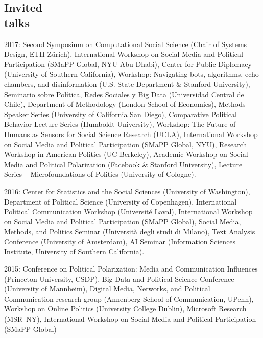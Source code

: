 \documentclass[margin,line,11pt]{resume}
\begin{document}
\begin{resume}
    
        \section{\mysidestyle Invited\\talks}
        
2017: Second Symposium on Computational Social Science (Chair of Systems Design, ETH Z\"{u}rich), International Workshop on Social Media and Political Participation (SMaPP Global, NYU Abu Dhabi), Center for Public Diplomacy (University of Southern California), Workshop: Navigating bots, algorithms, echo chambers, and disinformation (U.S. State Department \& Stanford University), Seminario sobre Pol\'{i}tica, Redes Sociales y Big Data (Universidad Central de Chile), Department of Methodology (London School of Economics), Methods Speaker Series (University of California San Diego), Comparative Political Behavior Lecture Series (Humboldt University), Workshop: The Future of Humans as Sensors for Social Science Research (UCLA),  International Workshop on Social Media and Political Participation (SMaPP Global, NYU), Research Workshop in American Politics (UC Berkeley), Academic Workshop on Social Media and Political Polarization (Facebook \& Stanford University),  Lecture Series -- Microfoundations of Politics (University of Cologne).

\newpage

2016: Center for Statistics and the Social Sciences (University of Washington), Department of Political Science (University of Copenhagen), International Political Communication Workshop (Universit\'{e} Laval), International Workshop on Social Media and Political Participation (SMaPP Global), Social Media, Methods, and Politics Seminar (Universit\`{a} degli studi di Milano), Text Analysis Conference (University of Amsterdam), AI Seminar (Information Sciences Institute, University of Southern California).

2015: Conference on Political Polarization: Media and Communication Influences (Princeton University, CSDP), Big Data and Political Science Conference (University of Mannheim), Digital Media, Networks, and Political Communication research group (Annenberg School of Communication, UPenn), Workshop on Online Politics (University College Dublin), Microsoft Research (MSR--NY), International Workshop on Social Media and Political Participation (SMaPP Global)


\end{resume}
\end{document}
